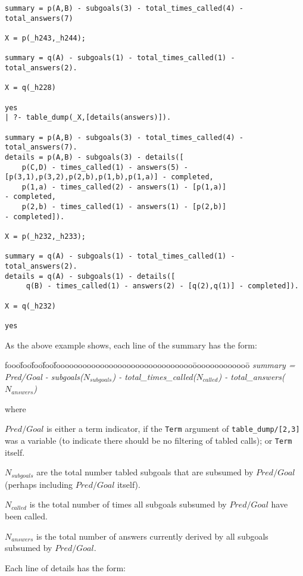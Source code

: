 \begin{description}
{\begin{verbatim}
summary = p(A,B) - subgoals(3) - total_times_called(4) - total_answers(7)

X = p(_h243,_h244);

summary = q(A) - subgoals(1) - total_times_called(1) - total_answers(2).

X = q(_h228)

yes
| ?- table_dump(_X,[details(answers)]).

summary = p(A,B) - subgoals(3) - total_times_called(4) - total_answers(7).
details = p(A,B) - subgoals(3) - details([
    p(C,D) - times_called(1) - answers(5) - [p(3,1),p(3,2),p(2,b),p(1,b),p(1,a)] - completed,
    p(1,a) - times_called(2) - answers(1) - [p(1,a)]                             - completed,
    p(2,b) - times_called(1) - answers(1) - [p(2,b)]                             - completed]).

X = p(_h232,_h233);

summary = q(A) - subgoals(1) - total_times_called(1) - total_answers(2).
details = q(A) - subgoals(1) - details([
     q(B) - times_called(1) - answers(2) - [q(2),q(1)] - completed]).

X = q(_h232)

yes
\end{verbatim}
}

As the above example shows, each line of the summary has the form:

\begin{tabbing}
fooo\=foo\=foo\=foo\=fooooooooooooooooooooooooooooooo\=ooooooooooooo\=\kill
%
{\em   summary = } \\
\> {\em Pred/Goal  - subgoals($N_{subgoals}$) - total\_times\_called($N_{called}$) - total\_answers($N_{answers}$)}
%
\end{tabbing}
where 
\bi
\item $Pred/Goal$ is either a term indicator, if the {\tt Term}
  argument of {\tt table\_dump/[2,3]} was a variable (to indicate there
  should be no filtering of tabled calls); or {\tt Term} itself.
%
\item $N_{subgoals}$ are the total number tabled subgoals that are
  subsumed by $Pred/Goal$ (perhaps including $Pred/Goal$ itself).
%
\item $N_{called}$ is the total number of times all subgoals subsumed
  by $Pred/Goal$ have been called.
%
\item $N_{answers}$ is the total number of answers currently derived
  by all subgoals subsumed by $Pred/Goal$.
\ei

Each line of details has the form:


\end{description}
